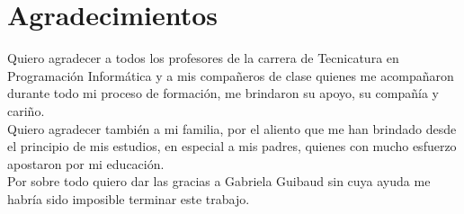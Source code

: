 \section*{Agradecimientos}
\jump[3]
\begin{raggedleft}
	
	Quiero agradecer a todos los profesores de la carrera de Tecnicatura en Programación
	Informática y a mis compañeros de clase quienes me acompañaron durante todo mi proceso
	de formación, me brindaron su apoyo, su compañía y cariño. \\
	\jump
	Quiero agradecer también a mi familia, por el aliento que me han brindado desde el
	principio de mis estudios, en especial a mis padres, quienes con mucho esfuerzo
	apostaron por mi educación.\\
	\jump
	Por sobre todo quiero dar las gracias a Gabriela Guibaud sin cuya ayuda me habría
	sido imposible terminar este trabajo.
	
\end{raggedleft}